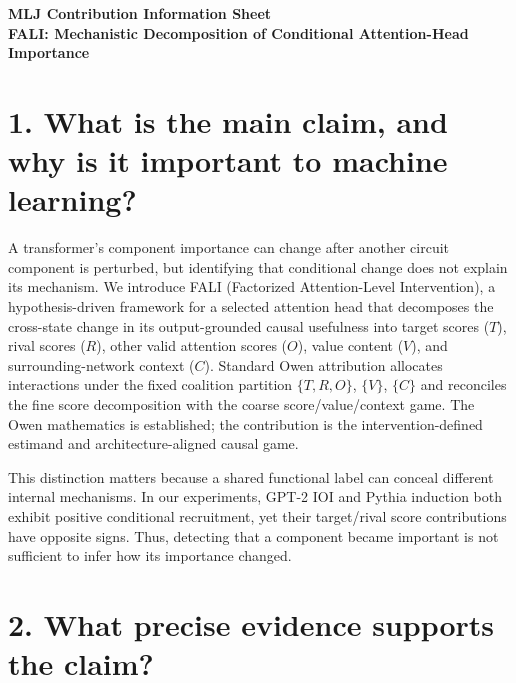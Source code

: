 \documentclass[11pt]{article}
\begin{document}
\begin{center}
{\Large\bfseries MLJ Contribution Information Sheet}\\[0.35em]
{\bfseries FALI: Mechanistic Decomposition of Conditional Attention-Head Importance}
\end{center}

\section*{1. What is the main claim, and why is it important to machine learning?}

A transformer's component importance can change after another circuit component is perturbed, but identifying that conditional change does not explain its mechanism. We introduce FALI (Factorized Attention-Level Intervention), a hypothesis-driven framework for a selected attention head that decomposes the cross-state change in its output-grounded causal usefulness into target scores ($T$), rival scores ($R$), other valid attention scores ($O$), value content ($V$), and surrounding-network context ($C$). Standard Owen attribution allocates interactions under the fixed coalition partition $\{T,R,O\}$, $\{V\}$, $\{C\}$ and reconciles the fine score decomposition with the coarse score/value/context game. The Owen mathematics is established; the contribution is the intervention-defined estimand and architecture-aligned causal game.

This distinction matters because a shared functional label can conceal different internal mechanisms. In our experiments, GPT-2 IOI and Pythia induction both exhibit positive conditional recruitment, yet their target/rival score contributions have opposite signs. Thus, detecting that a component became important is not sufficient to infer how its importance changed.

\section*{2. What precise evidence supports the claim?}
\end{document}
